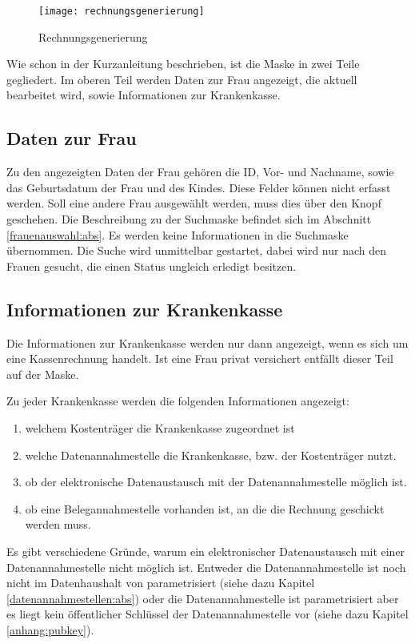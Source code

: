 \begin{figure}[ht]
\centering
\texttt{[image: rechnungsgenerierung]}
\caption{Rechnungsgenerierung\label{rechnungsgenerierung:fig}}
\end{figure}

Wie schon in der Kurzanleitung beschrieben, ist die Maske in zwei
Teile gegliedert. Im oberen Teil werden Daten zur Frau angezeigt,
die aktuell bearbeitet wird, sowie Informationen zur Krankenkasse.

\subsection{Daten zur Frau}
Zu den angezeigten Daten der Frau gehören 
die ID, Vor- und Nachname, sowie das Geburtsdatum der Frau und
des Kindes. Diese Felder können nicht erfasst werden. Soll eine andere
Frau ausgewählt werden, muss dies über den Knopf  geschehen.
Die Beschreibung zu der Suchmaske befindet sich im Abschnitt 
\vref{frauenauswahl:abs}. Es werden keine Informationen in die Suchmaske
übernommen. Die Suche wird unmittelbar gestartet, dabei wird nur nach
den Frauen gesucht, die einen Status ungleich erledigt besitzen.

\subsection{Informationen zur Krankenkasse}
Die Informationen zur Krankenkasse werden nur dann angezeigt, wenn es
sich um eine Kassenrechnung handelt. Ist eine Frau privat versichert 
entfällt dieser Teil auf der Maske.

Zu jeder Krankenkasse werden die folgenden Informationen angezeigt:
\begin{enumerate} 
\item
welchem Kostenträger die Krankenkasse zugeordnet ist
\item
welche Datenannahmestelle die Krankenkasse, bzw. der Kostenträger nutzt.
\item
ob der elektronische Datenaustausch mit der Datenannahmestelle möglich ist.
\item
ob eine Belegannahmestelle vorhanden ist, an die die Rechnung geschickt
werden muss.
\end{enumerate}

Es gibt verschiedene Gründe, warum ein elektronischer Datenaustausch mit 
einer Datenannahmestelle nicht möglich ist. Entweder die Datenannahmestelle
ist noch nicht im Datenhaushalt von \tinyHeb\/ parametrisiert
(siehe dazu Kapitel \vref{datenannahmestellen:abs}) oder die 
Datenannahmestelle ist parametrisiert aber es liegt kein öffentlicher
Schlüssel der Datenannahmestelle vor (siehe dazu Kapitel \vref{anhang:pubkey}).

